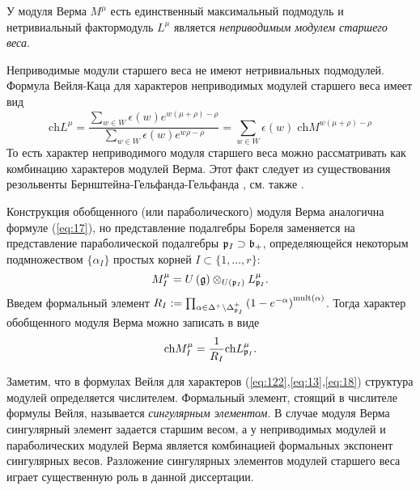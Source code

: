 У модуля Верма  $M^{\mu}$ есть единственный максимальный подмодуль и нетривиальный фактормодуль $L^{\mu}$ является 
{\it неприводимым модулем старшего веса}. 

Неприводимые модули старшего веса не имеют нетривиальных подмодулей. 
Формула Вейля-Каца для характеров неприводимых модулей старшего веса имеет вид
\begin{equation}
  \label{eq:13}
  \mathrm{ch} L^{\mu}=\frac{\sum_{w\in W} \epsilon(w) e^{w(\mu+\rho)-\rho}}{\sum_{w\in W}\epsilon(w) e^{w\rho-\rho}}=\sum_{w\in W} \epsilon(w)\; \mathrm{ch} M^{w(\mu+\rho)-\rho}
\end{equation}
То есть характер неприводимого модуля старшего веса можно рассматривать как комбинацию характеров модулей Верма. Этот факт следует из существования резольвенты Бернштейна-Гельфанда-Гельфанда \cite{bernstein1976category,bernstein1971structure}, см. также
\cite{humphreys2008representations}.

Конструкция обобщенного (или параболического) модуля Верма аналогична формуле (\ref{eq:17}), но представление подалгебры Бореля заменяется на представление параболической подалгебры $\mathfrak{p}_{I}\supset \mathfrak{b}_{+}$, определяющейся некоторым подмножеством  $\{\alpha_{I}\}$ простых корней $I\subset \{1,\dots, r\}$:
\begin{equation*}
M_{I}^{\mu}=U\left( \mathfrak{g}\right)\otimes _{U\left( \mathfrak{p}_{I}\right) }L_{\mathfrak{p}_{I}}^{\mu}.
\end{equation*}
Введем формальный элемент $R_{I}:=\prod_{\alpha \in \Delta
^{+}\setminus \Delta _{\mathfrak{p}_{I}}^{+}}\left( 1-e^{-\alpha }\right)
^{\mathrm{mult}(\alpha )}$. Тогда характер обобщенного модуля Верма можно записать в виде
\begin{equation}
  \label{eq:18}
  \mathrm{ch}M_{I}^{\mu}=\frac{1}{R_{I}}\mathrm{ch}L_{\mathfrak{p}_{I}}^{\mu }.
\end{equation}


Заметим, что в формулах Вейля для характеров (\ref{eq:122},\ref{eq:13},\ref{eq:18}) структура модулей определяется числителем. Формальный элемент, стоящий в числителе формулы Вейля, называется {\it сингулярным элементом}. В случае модуля Верма сингулярный элемент задается старшим весом, а у неприводимых модулей и параболических модулей Верма является комбинацией формальных экспонент сингулярных весов. Разложение сингулярных элементов модулей старшего веса играет существенную роль в данной диссертации. 

